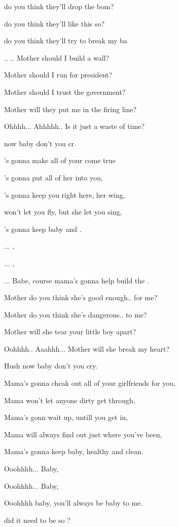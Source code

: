 
\zs
{} do you think they'll drop the bom?  

 do you think they'll like this so?   

  do you think they'll try to break my ba

..   .. Mother should I build a wall?
\ks

\zs
Mother should I run for president?

Mother should I trust the government?

Mother will they put me in the firing line?

Ohhhh...  Ahhhhh.. Is it just a waste of time?
\ks

\zr
{} now baby don't you cr.

's gonna make all of your  come true

's gonna put all of her  into you,

's gonna keep you right here,  her wing,

 won't let you fly, but she  let you sing,

's gonna keep baby  and .

...  ,

...  ,

... Babe,  course mama's gonna help build the .
\kr

\zs
Mother do you think she's good enough..			for me?

Mother do you think she's dangerous..			to me?

Mother will she tear your little boy apart?

Oohhhh..   Aaahhh...    Mother will she break my heart?
\ks

\zr
Hush now baby don't you cry.

Mama's gonna cheak out all of your girlfriends for you,

Mama won't let anyone dirty get through,

Mama's gonn wait up, untill you get in,

Mama will always find out just where you've been,

Mama's gonna keep baby, healthy and clean.

Ooohhhh...  Baby,

Ooohhhh...  Baby,

Ooohhhh baby, you'll always be baby to me.

 did it need to be so ?
\kr

\kp

